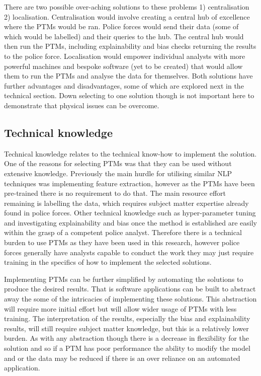 There are two possible over-aching solutions to these problems 1) centralisation 2) localisation. Centralisation would involve creating a central hub of excellence where the PTMs would be ran. Police forces would send their data (some of which would be labelled) and their queries to the hub. The central hub would then run the PTMs, including explainability and bias checks returning the results to the police force. Localisation would empower individual analysts with more powerful machines and bespoke software (yet to be created) that would allow them to run the PTMs and analyse the data for themselves. Both solutions have further advantages and disadvantages, some of which are explored next in the technical section. Down selecting to one solution though is not important here to demonstrate that physical issues can be overcome.    

\subsection{Technical knowledge} Technical knowledge relates to the technical know-how to implement the solution. One of the reasons for selecting PTMs was that they can be used without extensive knowledge. Previously the main hurdle for utilising similar NLP techniques was implementing feature extraction, however as the PTMs have been pre-trained there is no requirement to do that. The main  resource effort remaining is labelling the data, which requires subject matter expertise already found in police forces. Other technical knowledge such as hyper-parameter tuning and investigating explainability and bias  once the method is established are easily within the grasp of a competent police analyst. Therefore there is a technical burden to use PTMs as they have been used in this research, however police forces generally have analysts capable to conduct the work they may just require training in the specifics of how to implement the selected solutions.  

Implementing PTMs can be further simplified by automating the solutions to produce the desired results. That is software applications can be built to abstract away the some of the intricacies of implementing these solutions. This abstraction will require more initial effort but will allow wider usage of PTMs with less training. The interpretation of the results, especially the bias and explainability results,  will still require subject matter knowledge, but this is a relatively lower burden. As with any abstraction though there is a decrease in flexibility for the solution and so if a PTM has poor performance the ability to modify the model and or the data may be reduced if there is an over reliance on an automated application.  

